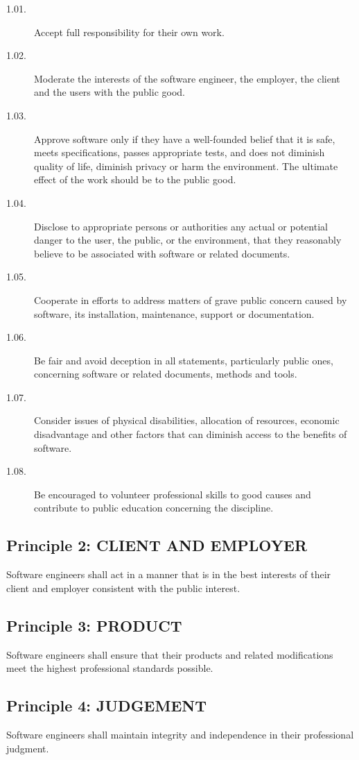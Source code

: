 \begin{description}
\item[1.01.] Accept full responsibility for their own work.
\item[1.02.] Moderate the interests of the software engineer, the employer, the
client and the users with the public good.
\item[1.03.] Approve software only if they have a well-founded belief that it is
safe, meets specifications, passes appropriate tests, and does not diminish
quality of life, diminish privacy or harm the environment. The ultimate effect
of the work should be to the public good.
\item[1.04.] Disclose to appropriate persons or authorities any actual or
potential danger to the user, the public, or the environment, that they
reasonably believe to be associated with software or related documents.
\item[1.05.] Cooperate in efforts to address matters of grave public concern
caused by software, its installation, maintenance, support or documentation.
\item[1.06.] Be fair and avoid deception in all statements, particularly public
ones, concerning software or related documents, methods and tools.
\item[1.07.] Consider issues of physical disabilities, allocation of resources,
economic disadvantage and other factors that can diminish access to the
benefits of software.
\item[1.08.] Be encouraged to volunteer professional skills to good causes and
contribute to public education concerning the discipline.
\end{description}

\subsection*{Principle 2: CLIENT AND EMPLOYER}
Software engineers shall act in a manner that is in the best interests of their
client and employer consistent with the public interest.

\subsection*{Principle 3: PRODUCT}
Software engineers shall ensure that their products and related modifications
meet the highest professional standards possible.

\subsection*{Principle 4: JUDGEMENT}
Software engineers shall maintain integrity and independence in their
professional judgment.

